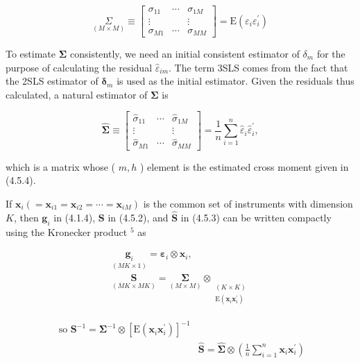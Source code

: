 \documentclass[10pt]{article}
\begin{document}
\[
\underset{(M \times M)}{\Sigma} \equiv\left[\begin{array}{ccc}
\sigma_{11} & \cdots & \sigma_{1 M}  \tag{4.5.6}\\
\vdots & & \vdots \\
\sigma_{M 1} & \cdots & \sigma_{M M}
\end{array}\right]=\mathrm{E}\left(\varepsilon_{i} \varepsilon_{i}^{\prime}\right)
\]

To estimate $\boldsymbol{\Sigma}$ consistently, we need an initial consistent estimator of $\delta_{m}$ for the purpose of calculating the residual $\hat{\varepsilon}_{i m}$. The term 3SLS comes from the fact that the 2SLS estimator of $\boldsymbol{\delta}_{m}$ is used as the initial estimator. Given the residuals thus calculated, a natural estimator of $\boldsymbol{\Sigma}$ is

\[
\widehat{\mathbf{\Sigma}} \equiv\left[\begin{array}{ccc}
\hat{\sigma}_{11} & \cdots & \hat{\sigma}_{1 M}  \tag{4.5.7}\\
\vdots & & \vdots \\
\hat{\sigma}_{M 1} & \cdots & \hat{\sigma}_{M M}
\end{array}\right]=\frac{1}{n} \sum_{i=1}^{n} \hat{\varepsilon}_{i} \hat{\varepsilon}_{i}^{\prime},
\]

which is a matrix whose ( $m, h$ ) element is the estimated cross moment given in (4.5.4).

If $\mathbf{x}_{i}\left(=\mathbf{x}_{i 1}=\mathbf{x}_{i 2}=\cdots=\mathbf{x}_{i M}\right)$ is the common set of instruments with dimension $K$, then $\mathbf{g}_{i}$ in (4.1.4), $\mathbf{S}$ in (4.5.2), and $\widehat{\mathbf{S}}$ in (4.5.3) can be written compactly using the Kronecker product ${ }^{5}$ as


\begin{gather*}
\underset{(M K \times 1)}{\mathbf{g}_{i}}=\boldsymbol{\varepsilon}_{i} \otimes \mathbf{x}_{i},  \tag{4.5.8}\\
\underset{(M K \times M K)}{\mathbf{S}}=\underset{(M \times M)}{\boldsymbol{\Sigma}} \otimes \underset{\substack{(K \times K) \\
\mathrm{E}\left(\mathbf{x}_{i} \mathbf{x}_{i}^{\prime}\right)}}{ } \tag{4.5.9}
\end{gather*}



\begin{align*}
\text { so } \mathbf{S}^{-1}=\mathbf{\Sigma}^{-1} \otimes\left[\mathrm{E}\left(\mathbf{x}_{i} \mathbf{x}_{i}^{\prime}\right)\right]^{-1} & \\
& \widehat{\mathbf{S}}=\widehat{\mathbf{\Sigma}} \otimes\left(\frac{1}{n} \sum_{i=1}^{n} \mathbf{x}_{i} \mathbf{x}_{i}^{\prime}\right) \tag{4.5.10}
\end{align*}
\end{document}

